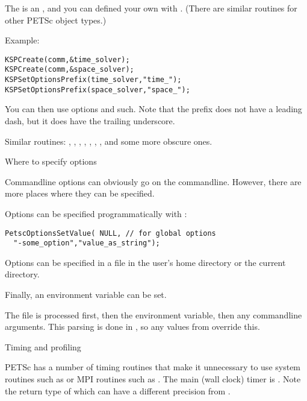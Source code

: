 The  is an , and you can defined
your own with 
.
(There are similar routines for other PETSc object types.)

Example:
\begin{lstlisting}
KSPCreate(comm,&time_solver);
KSPCreate(comm,&space_solver);
KSPSetOptionsPrefix(time_solver,"time_");
KSPSetOptionsPrefix(space_solver,"space_");
\end{lstlisting}
You can then use options  and such.
Note that the prefix does not have a leading dash,
but it does have the trailing underscore.

\begin{raggedlist}
Similar routines:
  , 
  , 
  , 
  , 
  , 
  , 
  , 
and some more obscure ones.
\end{raggedlist}


 {Where to specify options}

Commandline options can obviously go on the commandline. However, there are more
places where they can be specified.

Options can be specified programmatically with
:
\begin{lstlisting}
PetscOptionsSetValue( NULL, // for global options
  "-some_option","value_as_string");
\end{lstlisting}

Options can be specified in a file  in the user's home directory
or the current directory.

Finally, an environment variable  can be set.

The  file is processed first, then the environment variable,
then any commandline arguments. This parsing is done in ,
so any values from  override this.

 {Timing and profiling}

PETSc has a number of timing routines that make it unnecessary to
use system routines such as 
or MPI routines such as .
The main (wall clock) timer is .
Note the return type of  which
can have a different precision from .


